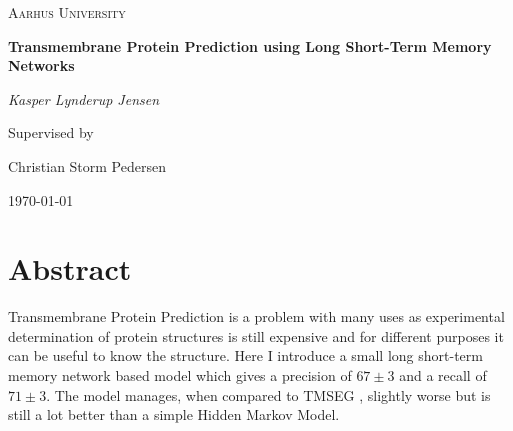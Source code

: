 \documentclass{article}
\begin{document}

\begin{titlepage}
	\centering
	{\scshape\LARGE Aarhus University \par}
	\vspace{1cm}
	{\huge\bfseries Transmembrane Protein Prediction using Long Short-Term Memory Networks\par}
	\vspace{2cm}
	{\Large\itshape Kasper Lynderup Jensen \par}
	\vfill
	Supervised by\par
	Christian Storm Pedersen
	
	\vfill
	
	{\large \today\par}
\end{titlepage}

\section*{Abstract}
Transmembrane Protein Prediction is a problem with many uses 
as experimental determination of protein structures is still expensive
and for different purposes it can be useful to know the structure.
Here I introduce a small long short-term memory network based model 
which gives a precision of $67 \pm 3$ and a recall of $71 \pm 3$. 
The model manages, when compared to TMSEG \cite{tmseg}, slightly 
worse but is still a lot better than a simple Hidden Markov Model.

\tableofcontents






\end{document}
